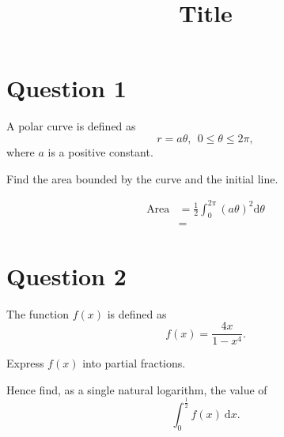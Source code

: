 \documentclass[a4paper, 11pt]{article}
\title{Title}
\begin{document}
    \maketitle
    
    \tableofcontents

    \newpage
    \section{Question 1}

        \begin{question}
            A polar curve is defined as \[ r = a \theta, ~~ 0 \leq \theta \leq 2 \pi,  \] where \(a \) is a positive constant. 

            Find the area bounded by the curve and the initial line.
        \end{question}

        \begin{solution}
            \begin{align*}
                \text{Area} &= \frac{1}{2} \int_{0}^{2\pi} (a \theta)^2 \mathrm{d } \theta \\
                &= 
            \end{align*}

        \end{solution}


        
    \section{Question 2}

        \begin{question}
            The function \(f(x) \) is defined as \[ f(x) = \frac{4x}{1 - x^4}. \]

            \begin{questionparts}
                \item Express \(f(x) \) into partial fractions. 
                \item Hence find, as a single natural logarithm, the value of \[ \int_{0}^{\frac{1}{2}} f(x)~ \mathrm{d } x. \]
            \end{questionparts}
            
        \end{question}
\end{document}
